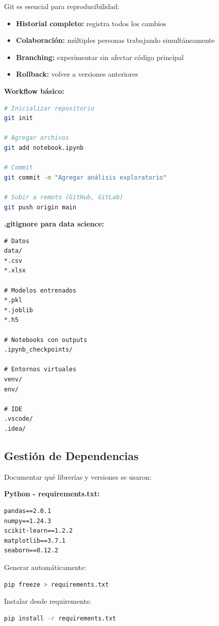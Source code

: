 \documentclass[11pt,a4paper]{article}
\begin{document}
Git es esencial para reproducibilidad:

\begin{itemize}
\item \textbf{Historial completo:} registra todos los cambios
\item \textbf{Colaboración:} múltiples personas trabajando simultáneamente
\item \textbf{Branching:} experimentar sin afectar código principal
\item \textbf{Rollback:} volver a versiones anteriores
\end{itemize}

\textbf{Workflow básico:}
\begin{lstlisting}[language=bash]
# Inicializar repositorio
git init

# Agregar archivos
git add notebook.ipynb

# Commit
git commit -m "Agregar análisis exploratorio"

# Subir a remoto (GitHub, GitLab)
git push origin main
\end{lstlisting}

\textbf{.gitignore para data science:}
\begin{lstlisting}
# Datos
data/
*.csv
*.xlsx

# Modelos entrenados
*.pkl
*.joblib
*.h5

# Notebooks con outputs
.ipynb_checkpoints/

# Entornos virtuales
venv/
env/

# IDE
.vscode/
.idea/
\end{lstlisting}

\subsection{Gestión de Dependencias}

Documentar qué librerías y versiones se usaron:

\textbf{Python - requirements.txt:}
\begin{lstlisting}
pandas==2.0.1
numpy==1.24.3
scikit-learn==1.2.2
matplotlib==3.7.1
seaborn==0.12.2
\end{lstlisting}

Generar automáticamente:
\begin{lstlisting}[language=bash]
pip freeze > requirements.txt
\end{lstlisting}

Instalar desde requirements:
\begin{lstlisting}[language=bash]
pip install -r requirements.txt
\end{lstlisting}
\end{document}
